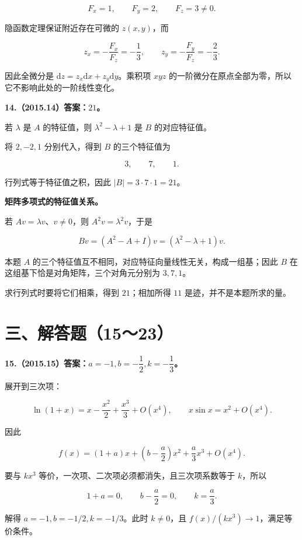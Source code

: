 \documentclass[UTF8,11pt,fontset=windows]{ctexart}
\begin{document}
$$
F_x=1,\qquad F_y=2,\qquad F_z=3\ne0.
$$

隐函数定理保证附近存在可微的 $z(x,y)$，而

$$
z_x=-\frac{F_x}{F_z}=-\frac13,
\qquad z_y=-\frac{F_y}{F_z}=-\frac23.
$$

因此全微分是 $\mathrm dz=z_x\mathrm dx+z_y\mathrm dy$。乘积项 $xyz$ 的一阶微分在原点全部为零，所以它不影响此处的一阶线性变化。

\clearpage

\textbf{14.（2015.14）答案：$21$。}

若 $\lambda$ 是 $A$ 的特征值，则 $\lambda^2-\lambda+1$ 是 $B$ 的对应特征值。

将 $2,-2,1$ 分别代入，得到 $B$ 的三个特征值为

$$
3,\qquad7,\qquad1.
$$

行列式等于特征值之积，因此 $|B|=3\cdot7\cdot1=21$。

\textbf{矩阵多项式的特征值关系。}

若 $Av=\lambda v$、$v\ne0$，则 $A^2v=\lambda^2v$，于是

$$
Bv=(A^2-A+I)v=(\lambda^2-\lambda+1)v.
$$

本题 $A$ 的三个特征值互不相同，对应特征向量线性无关，构成一组基；因此 $B$ 在这组基下恰是对角矩阵，三个对角元分别为 $3,7,1$。

求行列式时要将它们相乘，得到 $21$；相加所得 $11$ 是迹，并不是本题所求的量。

\clearpage

\section*{三、解答题（15～23）}

\textbf{15.（2015.15）答案：$a=-1,b=-\dfrac12,k=-\dfrac13$。}

展开到三次项：

$$
\ln(1+x)=x-\frac{x^2}{2}+\frac{x^3}{3}+O(x^4),
\qquad x\sin x=x^2+O(x^4).
$$

因此

$$
f(x)=(1+a)x+\left(b-\frac a2\right)x^2+\frac a3x^3+O(x^4).
$$

要与 $kx^3$ 等价，一次项、二次项必须都消失，且三次项系数等于 $k$，所以

$$
1+a=0,\qquad b-\frac a2=0,\qquad k=\frac a3.
$$

解得 $a=-1,b=-1/2,k=-1/3$。此时 $k\ne0$，且 $f(x)/(kx^3)\to1$，满足等价条件。
\end{document}

